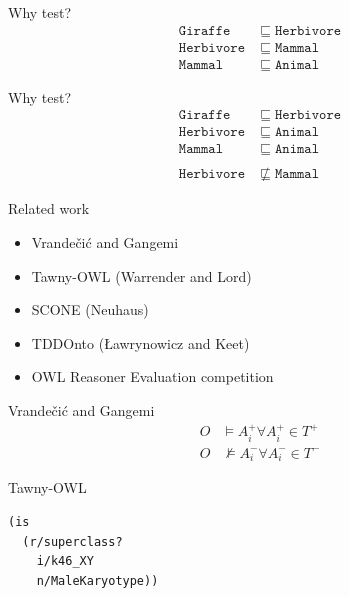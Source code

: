 \documentclass[17pt,mathserif]{beamer}
\newcommand{\oclass}[1]{\ensuremath{\mathtt{#1}}}
\newcommand{\osub}{\sqsubseteq}
\newcommand{\onsub}{\not\sqsubseteq}
\begin{document}
\begin{frame}[t]{Why test?}
  \begin{align*}
    \oclass{Giraffe} &\osub \oclass{Herbivore} \\
    \oclass{Herbivore} &\osub \oclass{Mammal} \\
    \oclass{Mammal} &\osub \oclass{Animal}
  \end{align*}
\end{frame}

\begin{frame}[t]{Why test?}
  \begin{align*}
    \oclass{Giraffe} &\osub \oclass{Herbivore} \\
    \oclass{Herbivore} &\osub \oclass{Animal} \\
    \oclass{Mammal} &\osub \oclass{Animal} \\
    \\
    \oclass{Herbivore} &\onsub \oclass{Mammal}
  \end{align*}
\end{frame}

\begin{frame}{Related work}
  \begin{itemize}
    \item Vrande\v{c}i\'c and Gangemi
    \item Tawny-OWL (Warrender and Lord)
    \item SCONE (Neuhaus)
    \item TDDOnto ({\L}awrynowicz and Keet)
    \item OWL Reasoner Evaluation competition
  \end{itemize}
\end{frame}

\begin{frame}{Vrande\v{c}i\'c and Gangemi}
  \begin{align*}
    O &\models A_i^{+} \forall A_i^{+} \in T^{+} \\
    O &\not\models A_i^{-} \forall A_i^{-} \in T^{-}
  \end{align*}
\end{frame}

\begin{frame}[fragile]{Tawny-OWL}
  \begin{lstlisting}[language=Lisp,basicstyle=\normalsize\ttfamily]
(is
  (r/superclass?
    i/k46_XY
    n/MaleKaryotype))
  \end{lstlisting}
\end{frame}
\end{document}
